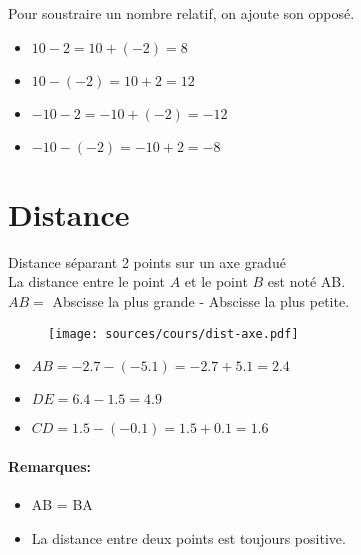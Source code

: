 \documentclass[paper=a4, fontsize=10pt]{scrartcl} %
\begin{document}
\begin{Definition}{}
  Pour soustraire un nombre relatif, on ajoute son opposé.
\end{Definition}

\begin{itemize}[label=$\Diamond$]
\item $ 10 - 2    = 10 + (-2) =  8$
\item $ 10 - (-2) = 10 + 2    = 12$
\item $-10 - 2    =-10 + (-2) =-12$
\item $-10 - (-2) =-10 + 2    =-8$
\end{itemize}


\section{Distance}

\begin{Definition}{Distance séparant 2 points sur un axe gradué}\\
  La distance entre le point $A$ et le point $B$ est noté AB.\\
  $AB = $ Abscisse la plus grande - Abscisse la plus petite.
\end{Definition}

\begin{figure}[H]
  \centering
  \texttt{[image: sources/cours/dist-axe.pdf]}
\end{figure}

\begin{itemize}[label=$\Diamond$]
\item $AB = -2.7 - (-5.1) = -2.7 + 5.1 = 2.4$
\item $DE = 6.4 - 1.5 = 4.9$
\item $CD = 1.5 - (-0.1) = 1.5 + 0.1 = 1.6$
\end{itemize}

\paragraph{Remarques: } 
\begin{itemize}
\item AB = BA
\item La distance entre deux points est toujours positive.
\end{itemize}
\end{document}
